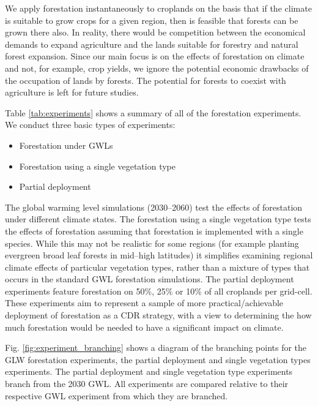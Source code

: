 \documentclass[]{article}
\begin{document}
We apply forestation instantaneously to croplands on the basis that if the climate is suitable to grow crops for a given region, then is feasible that forests can be grown there also. In reality, there would be competition between the economical demands to expand agriculture and the lands suitable for forestry and natural forest expansion.
Since our main focus is on the effects of forestation on climate and not, for example, crop yields, we ignore the potential economic drawbacks of the occupation of lands by forests.
The potential for forests to coexist with agriculture is left for future studies.

Table \ref{tab:experiments} shows a summary of all of the forestation experiments. We conduct three basic types of experiments:

\begin{itemize}
    \item Forestation under GWLs
    \item Forestation using a single vegetation type
    \item Partial deployment
\end{itemize}

The global warming level simulations (2030–2060) test the effects of forestation under different climate states.
The forestation using a single vegetation type tests the effects of forestation assuming that forestation is implemented with a single species.
While this may not be realistic for some regions (for example planting evergreen broad leaf forests in mid–high latitudes) it simplifies examining regional climate effects of particular vegetation types, rather than a mixture of types that occurs in the standard GWL forestation simulations.
The partial deployment experiments feature forestation on 50\%, 25\% or 10\% of all croplands per grid-cell.
These experiments aim to represent a sample of more practical/achievable deployment of forestation as a CDR strategy, with a view to determining the how much forestation would be needed to have a significant impact on climate.

Fig. \ref{fig:experiment_branching} shows a diagram of the branching points for the GLW forestation experiments, the partial deployment and single vegetation types experiments.
The partial deployment and single vegetation type experiments branch from the 2030 GWL.
All experiments are compared relative to their respective GWL experiment from which they are branched.
\end{document}
